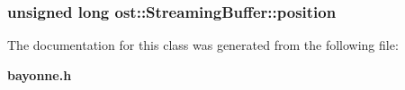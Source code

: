 \subsubsection[{position}]{\setlength{\rightskip}{0pt plus 5cm}unsigned long {\bf ost::StreamingBuffer::position}\hspace{0.3cm}{\ttfamily  [protected]}}\label{classost_1_1_streaming_buffer_a1c341d942434d3358954527fec452ee6}


The documentation for this class was generated from the following file:\begin{DoxyCompactItemize}
\item 
{\bf bayonne.h}\end{DoxyCompactItemize}
